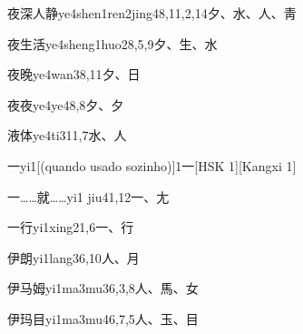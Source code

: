 \begin{entry}{夜深人静}{ye4shen1ren2jing4}{8,11,2,14}{⼣、⽔、⼈、⾭}
\end{entry}

\begin{entry}{夜生活}{ye4sheng1huo2}{8,5,9}{⼣、⽣、⽔}
\end{entry}

\begin{entry}{夜晚}{ye4wan3}{8,11}{⼣、⽇}
\end{entry}

\begin{entry}{夜夜}{ye4ye4}{8,8}{⼣、⼣}
\end{entry}

\begin{entry}{液体}{ye4ti3}{11,7}{⽔、⼈}
\end{entry}

\begin{entry}{一}{yi1}[(quando usado sozinho)]{1}{⼀}[HSK 1][Kangxi 1]
\end{entry}

\begin{entry}{一……就……}{yi1 jiu4}{1,12}{⼀、⼪}
\end{entry}

\begin{entry}{一行}{yi1xing2}{1,6}{⼀、⾏}
\end{entry}

\begin{entry}{伊朗}{yi1lang3}{6,10}{⼈、⽉}
\end{entry}

\begin{entry}{伊马姆}{yi1ma3mu3}{6,3,8}{⼈、⾺、⼥}
\end{entry}

\begin{entry}{伊玛目}{yi1ma3mu4}{6,7,5}{⼈、⽟、⽬}
\end{entry}


